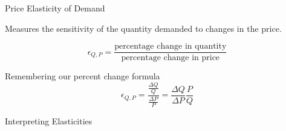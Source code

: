 \documentclass[12pt,t]{beamer}
\begin{document}
\begin{frame}{Price Elasticity of Demand}
  
  Measures the sensitivity of the quantity demanded to changes in the price.

  $$
    \epsilon_{Q,P} = \frac{\text{percentage change in quantity}}{\text{percentage change in price}}
  $$

  \pause\bigskip
  Remembering our percent change formula
  $$
    \epsilon_{Q,P} = \frac{\frac{\Delta Q}{Q}}{\frac{\Delta P}{P} } = \frac{\Delta Q}{\Delta P} \frac{P}{Q}
  $$
\end{frame}

\begin{frame}{Interpreting Elasticities}
  \bigskip

\end{frame}
\end{document}
